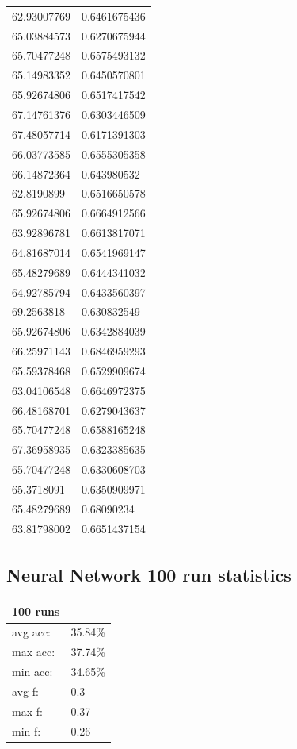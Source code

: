 \begin{longtable}{@{}ll@{}}
62.93007769 & 0.6461675436 \\
65.03884573 & 0.6270675944 \\
65.70477248 & 0.6575493132 \\
65.14983352 & 0.6450570801 \\
65.92674806 & 0.6517417542 \\
67.14761376 & 0.6303446509 \\
67.48057714 & 0.6171391303 \\
66.03773585 & 0.6555305358 \\
66.14872364 & 0.643980532  \\
62.8190899  & 0.6516650578 \\
65.92674806 & 0.6664912566 \\
63.92896781 & 0.6613817071 \\
64.81687014 & 0.6541969147 \\
65.48279689 & 0.6444341032 \\
64.92785794 & 0.6433560397 \\
69.2563818  & 0.630832549  \\
65.92674806 & 0.6342884039 \\
66.25971143 & 0.6846959293 \\
65.59378468 & 0.6529909674 \\
63.04106548 & 0.6646972375 \\
66.48168701 & 0.6279043637 \\
65.70477248 & 0.6588165248 \\
67.36958935 & 0.6323385635 \\
65.70477248 & 0.6330608703 \\
65.3718091  & 0.6350909971 \\
65.48279689 & 0.68090234   \\
63.81798002 & 0.6651437154 \\ \bottomrule
\end{longtable}

\subsection{Neural Network 100 run statistics}
\begin{table}[H]
	\begin{tabular}{@{}ll@{}}
		\toprule
		100 runs &         \\ \midrule
		avg acc: & 35.84\% \\
		max acc: & 37.74\% \\
		min acc: & 34.65\% \\
		avg f:   & 0.3     \\
		max f:   & 0.37    \\
		min f:   & 0.26    \\ \bottomrule
	\end{tabular}
	\centering
\end{table}

